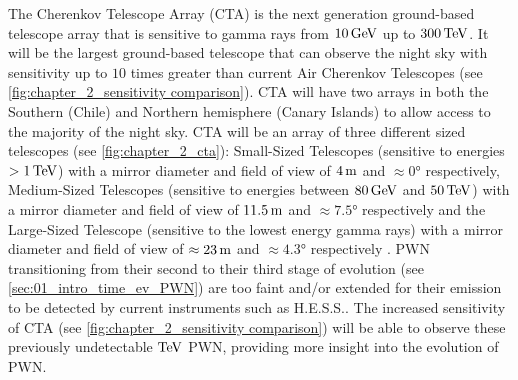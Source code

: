 The Cherenkov Telescope Array (CTA) is the next generation ground-based telescope array that is sensitive to gamma rays from $10\,\si{\giga\electronvolt}$ up to $300\,\TeV$. It will be the largest ground-based telescope that can observe the night sky with sensitivity up to $10$ times greater than current Air Cherenkov Telescopes (see \autoref{fig:chapter_2_sensitivity comparison}). CTA will have two arrays in both the Southern (Chile) and Northern hemisphere (Canary Islands) to allow access to the majority of the night sky.
\newpar
CTA will be an array of three different sized telescopes (see \autoref{fig:chapter_2_cta}): Small-Sized Telescopes (sensitive to energies $>1\,\TeV$) with a mirror diameter and field of view of $4\,\si{\meter}$ and $\approx\ang{0}$ respectively, Medium-Sized Telescopes (sensitive to energies between $80\,\si{\giga\electronvolt}$ and $50\,\TeV$) with a mirror diameter and field of view of $11.5\,\si{\meter}$ and $\approx\ang{7.5}$ respectively and the Large-Sized Telescope (sensitive to the lowest energy gamma rays) with a mirror diameter and field of view of $\approx 23\,\si{\meter}$ and $\approx\ang{4.3}$ respectively \citep{cherenkov_telescope_array,2019scta.book.....C}.
\newpar
PWN transitioning from their second to their third stage of evolution (see \autoref{sec:01_intro_time_ev_PWN}) are too faint and/or extended for their emission to be detected by current instruments such as H.E.S.S.. The increased sensitivity of CTA (see \autoref{fig:chapter_2_sensitivity comparison}) will be able to observe these previously undetectable $\TeV$ PWN, providing more insight into the evolution of PWN.